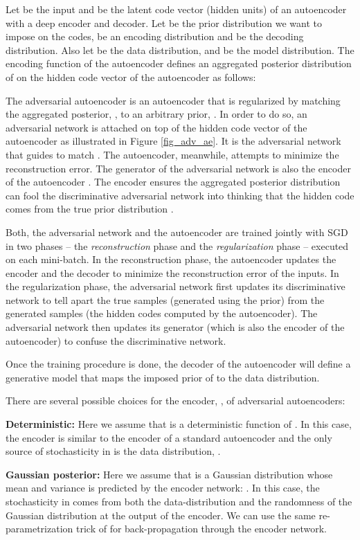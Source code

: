 \documentclass{article}
\begin{document}
Let  be the input and  be the latent code vector (hidden units) of an autoencoder with a deep encoder and decoder.
Let  be the prior distribution we want to impose on the codes,  be an encoding distribution
and  be the decoding distribution.
Also let  be the data distribution, and  be the model distribution.
The encoding function of the autoencoder  defines an aggregated posterior distribution of  on the hidden code vector of the autoencoder as follows:

The adversarial autoencoder is an autoencoder that is regularized by matching the aggregated posterior, , to an arbitrary prior, .
In order to do so, an adversarial network is attached on top of the hidden code vector of the autoencoder as illustrated in Figure \ref{fig_adv_ae}.
It is the adversarial network that guides  to match . The autoencoder, meanwhile, attempts to minimize the
reconstruction error.  The generator of the adversarial network is also the encoder of the autoencoder .
The encoder ensures the aggregated posterior distribution can fool the discriminative adversarial network into thinking that the hidden code  comes from the true prior distribution .


Both, the adversarial network and the autoencoder are trained jointly with SGD in two phases -- the \emph{reconstruction} phase and the \emph{regularization}
phase -- executed on each mini-batch.  In the reconstruction phase, the autoencoder updates the encoder and the decoder to minimize the reconstruction error
of the inputs. In the regularization phase, the adversarial network first updates its discriminative network to tell apart the true samples (generated
using the prior) from the generated samples (the hidden codes computed by the autoencoder). The adversarial network then updates its generator (which is also the encoder of the autoencoder)
to confuse the discriminative network.

Once the training procedure is done, the decoder of the autoencoder will define a generative model that maps the imposed prior of  to the data distribution.

There are several possible choices for the encoder, , of adversarial autoencoders:

{\bf Deterministic:} Here we assume that  is a deterministic function of . In this case, the encoder is similar to the encoder of a standard autoencoder and the only source of stochasticity in  is the data distribution, .

{\bf Gaussian posterior:} Here we assume that  is a Gaussian distribution whose mean and variance is predicted by the encoder network: . In this case, the stochasticity in  comes from both the data-distribution and the randomness of the Gaussian distribution at the output of the encoder. We can use the same re-parametrization trick of \citep{vae} for back-propagation through the encoder network.
\end{document}
